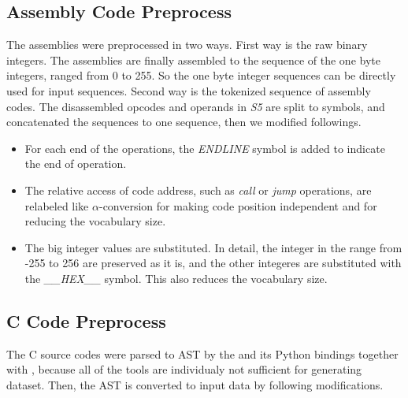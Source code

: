 \documentclass[senior,final,11pt]{iscs-thesis}
\begin{document}
\subsection{Assembly Code Preprocess}
The assemblies were preprocessed in two ways.
First way is the raw binary integers. The assemblies are finally assembled to the sequence of the one byte integers, ranged from 0 to 255.
So the one byte integer sequences can be directly used for input sequences.
Second way is the tokenized sequence of assembly codes. 
The disassembled opcodes and operands in {\sl S5} are split to symbols, and concatenated the sequences to one sequence, then we modified followings.
\begin{itemize}
\item For each end of the operations, the {\sl ENDLINE} symbol is added to indicate the end of operation.
\item 
The relative access of code address, such as {\sl call} or {\sl jump} operations, 
are relabeled like $\alpha$-conversion for making code position independent and for reducing the vocabulary size.
\item The big integer values are substituted. 
In detail, the integer in the range from -255 to 256 are preserved as it is, and the other integeres are substituted with the {\sl \_\_HEX\_\_} symbol.
This also reduces the vocabulary size.
\end{itemize}


\subsection{C Code Preprocess}
The C source codes were parsed to AST by the \cite{clang} and its Python bindings together with \cite{pycparser}, 
because all of the tools are individualy not sufficient for generating dataset.
Then, the AST is converted to input data by following modifications.
\end{document}
